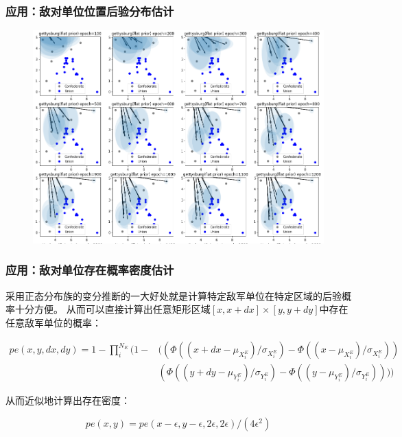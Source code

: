 \documentclass{beamer}
\begin{document}
\begin{frame}
\frametitle{应用：敌对单位位置后验分布估计}

\begin{figure}[htb]
\includegraphics[width=0.8\linewidth]{gettysburg-point-small.png}
\label{fig:gettysburgInit}
\end{figure}



\end{frame}

\begin{frame}
\frametitle{应用：敌对单位存在概率密度估计}

采用正态分布族的变分推断的一大好处就是计算特定敌军单位在特定区域的后验概率十分方便。
从而可以直接计算出任意矩形区域$[x,x+dx]\times[y,y+dy]$中存在任意敌军单位的概率：

\begin{align*}
pe(x,y,dx,dy) = 1-
\prod_i^{N_E}
(1-
& ((\Phi((x + dx - \mu_{X^E_i})/\sigma_{X^E_i}) - \Phi((x - \mu_{X^E_i})/\sigma_{X^E_i})) \\
&  (\Phi((y + dy - \mu_{Y^E_i})/\sigma_{Y^E_i}) - \Phi((y - \mu_{Y^E_i})/\sigma_{Y^E_i})))
)
\end{align*}


从而近似地计算出存在密度：

$$
pe(x,y) = pe(x-\epsilon,y-\epsilon,2\epsilon,2\epsilon)/(4 \epsilon^2)
$$

\end{frame}
\end{document}
